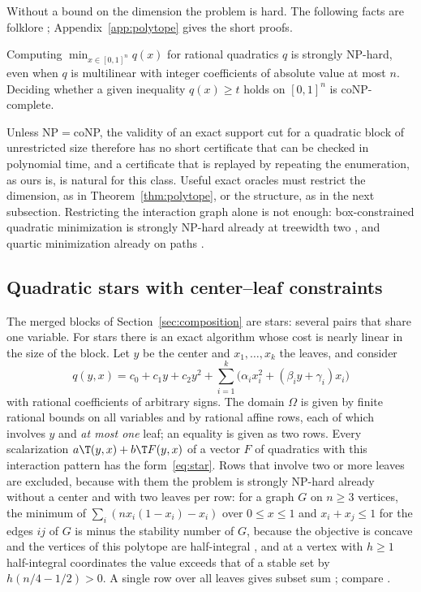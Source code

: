 Without a bound on the dimension the problem is hard. The following facts
are folklore \citep[Section~2.3]{BurerLetchford2009}; Appendix~\ref{app:polytope}
gives the short proofs.

\begin{proposition}\label{prop:maxcut}
Computing $\min_{x\in[0,1]^n}q(x)$ for rational quadratics $q$ is strongly
NP-hard, even when $q$ is multilinear with integer coefficients of absolute
value at most $n$. Deciding whether a given inequality $q(x)\ge t$ holds on
$[0,1]^n$ is coNP-complete.
\end{proposition}

Unless NP${}={}$coNP, the validity of an exact support cut for a quadratic
block of unrestricted size therefore has no short certificate that can be
checked in polynomial time, and a certificate that is replayed by repeating
the enumeration, as ours is, is natural for this class. Useful exact oracles
must restrict the dimension, as in Theorem~\ref{thm:polytope}, or the
structure, as in the next subsection. Restricting the interaction graph alone
is not enough: box-constrained quadratic minimization is strongly NP-hard
already at treewidth two \citep[Theorem~3]{DelPiaKhajavirad2026}, and quartic
minimization already on paths \citep[Theorem~2]{DelPiaKhajavirad2026}.

\subsection{Quadratic stars with center--leaf constraints}\label{sec:star}

The merged blocks of Section~\ref{sec:composition} are stars: several pairs
that share one variable. For stars there is an exact
algorithm whose cost is nearly linear in the size of the block. Let $y$ be
the center and $x_1,\dots,x_k$ the leaves, and consider
\begin{equation}\label{eq:star}
q(y,x)=c_0+c_1y+c_2y^2+\sum_{i=1}^k\bigl(\alpha_ix_i^2+(\beta_iy+\gamma_i)x_i\bigr)
\end{equation}
with rational coefficients of arbitrary signs. The domain $\Omega$ is given by
finite rational bounds on all variables and by rational affine rows, each of
which involves $y$ and \emph{at most one} leaf; an equality is given as two
rows. Every scalarization $a\T(y,x)+b\T F(y,x)$ of a vector $F$ of quadratics
with this interaction pattern has the form~\eqref{eq:star}. Rows that involve
two or more leaves are excluded, because with them the problem is strongly
NP-hard already without a center and with two leaves per row: for a graph $G$
on $n\ge3$ vertices, the minimum of $\sum_i(nx_i(1-x_i)-x_i)$ over $0\le x\le1$
and $x_i+x_j\le1$ for the edges $ij$ of $G$ is minus the stability number of
$G$, because the objective is concave and the vertices of this polytope are
half-integral \citep{NemhauserTrotter1974}, and at a vertex with $h\ge1$
half-integral coordinates the value exceeds that of a stable set by
$h(n/4-1/2)>0$. A single row over all leaves gives subset sum
\citep{Karp1972}; compare \citet{MoreVavasis1990}.

